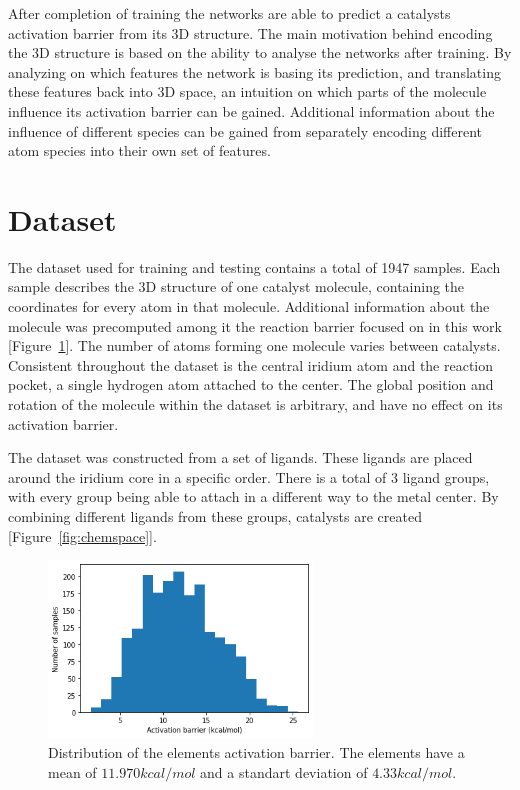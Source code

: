 After completion of training the networks are able to predict a catalysts activation barrier from its 3D structure.
The main motivation behind encoding the 3D structure is based on the ability to analyse the networks after training.
By analyzing on which features the network is basing its prediction, and translating these features back into 
3D space, an intuition on which parts of the molecule influence its activation barrier can be gained.
Additional information about the influence of different species can be gained 
from separately encoding different atom species into their own set of features.

\section{Dataset}

The dataset used for training and testing contains a total of 1947 samples.
Each sample describes the 3D structure of one catalyst molecule, 
containing the coordinates for every atom in that molecule.
Additional information about the molecule was precomputed among it the reaction barrier focused on in this work [Figure~\ref{fig:barriers}]. %
The number of atoms forming one molecule varies between catalysts.
Consistent throughout the dataset is the central iridium atom and the reaction pocket, a single hydrogen atom attached to the center.
The global position and rotation of the molecule within the dataset is arbitrary, and have no effect on its activation barrier.

The dataset was constructed from a set of ligands.
These ligands are placed around the iridium core in a specific order.
There is a total of 3 ligand groups, with every group being able to attach in a different way to the metal center.
By combining different ligands from these groups, catalysts are created [Figure~\ref{fig:chemspace}].

\begin{figure}[H]
  \centering
  \includegraphics[width=7cm]{figures/introduction/barrier.png}
  \caption[Distribution of activation barriers]{Distribution of the elements activation barrier. The elements have a mean of $11.970 kcal/mol$ and a standart deviation of $4.33 kcal/mol$.}
  \label{fig:barriers}
\end{figure}

